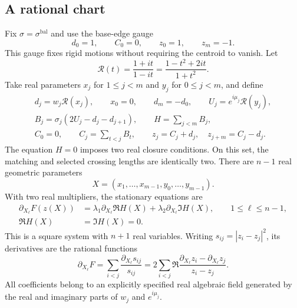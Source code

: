 \documentclass[11pt,reqno]{amsart}
\numberwithin{equation}{section}
\theoremstyle{definition}
\theoremstyle{remark}
\newcommand{\bal}{\mathrm{bal}}
\begin{document}
\subsection{A rational chart}
Fix $\sigma=\sigma^{\bal}$ and use the base-edge gauge
\begin{equation}\label{eq:base-gauge}
 d_0=1,\qquad C_0=0,\qquad z_0=1,\qquad z_m=-1.
\end{equation}
This gauge fixes rigid motions without requiring the centroid to vanish. Let
\[
 \mathcal R(t)=\frac{1+it}{1-it}
              =\frac{1-t^2+2it}{1+t^2}.
\]
Take real parameters $x_j$ for $1\le j<m$ and $y_j$ for $0\le j<m$, and define
\begin{equation}\label{eq:rational-chart}
 \begin{gathered}
 d_j=w_j\mathcal R(x_j),\qquad x_0=0,\qquad d_m=-d_0,\qquad
 U_j=e^{i\mu_j}\mathcal R(y_j),\\
 B_j=\sigma_j(2U_j-d_j-d_{j+1}),\qquad
 H=\sum_{j<m}B_j,\\
 C_0=0,\qquad C_j=\sum_{t<j}B_t,\qquad
 z_j=C_j+d_j,\quad z_{j+m}=C_j-d_j.
 \end{gathered}
\end{equation}
The equation $H=0$ imposes two real closure conditions. On this set, the matching and selected crossing lengths are identically two. There are $n-1$ real geometric parameters
\[
 X=(x_1,\ldots,x_{m-1},y_0,\ldots,y_{m-1}).
\]
With two real multipliers, the stationary equations are
\begin{equation}\label{eq:rational-system}
 \begin{split}
 \partial_{X_\ell}F(z(X))
 &=\lambda_1\partial_{X_\ell}\Re H(X)
   +\lambda_2\partial_{X_\ell}\Im H(X),\qquad 1\le\ell\le n-1,\\
 \Re H(X)&=\Im H(X)=0.
 \end{split}
\end{equation}
This is a square system with $n+1$ real variables. Writing $s_{ij}=|z_i-z_j|^2$, its derivatives are the rational functions
\begin{equation}\label{eq:rational-force}
 \partial_{X_\ell}F
 =\sum_{i<j}\frac{\partial_{X_\ell}s_{ij}}{s_{ij}}
 =2\sum_{i<j}\Re\frac{\partial_{X_\ell}z_i-\partial_{X_\ell}z_j}{z_i-z_j}.
\end{equation}
All coefficients belong to an explicitly specified real algebraic field generated by the real and imaginary parts of $w_j$ and $e^{i\mu_j}$.
\end{document}
